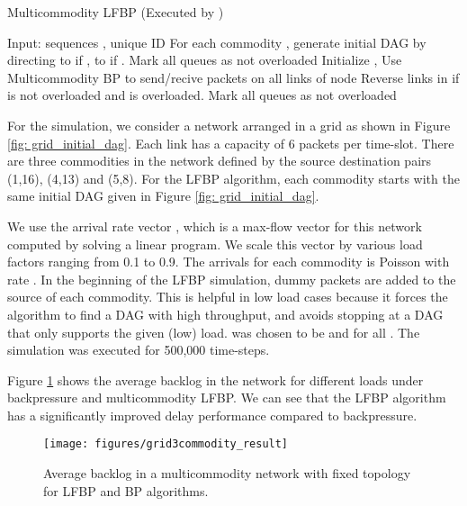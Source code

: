\documentclass{sig-alternate-2013}
\begin{document}
\begin{algorithm}[h] 
\caption{Multicommodity LFBP (Executed by )}
\label{alg:mlfbp}
\begin{algorithmic}[1]
\State Input: sequences , unique ID 
\State For each commodity , generate initial DAG  by directing  to  if , to  if .
\State Mark all queues  as not overloaded
\State Initialize , 
	\State Use Multicommodity BP to send/recive packets on all links of node 
	\ForAll {}	
		\If {}  \EndIf
	\EndFor
	\State 
\State	
	\State 
	\If {} 
		\ForAll {}
			\State Reverse links  in  if  is not overloaded and  is overloaded.
		\EndFor
		\State 
		\State Mark all queues as not overloaded
	\EndIf
	
\EndWhile
\end{algorithmic}
\end{algorithm}

For the simulation, we consider a network arranged in a  grid as shown in Figure \ref{fig: grid_initial_dag}. Each link has a capacity of 6 packets per time-slot. There are three commodities in the network defined by the source destination pairs (1,16), (4,13) and (5,8). For the LFBP algorithm, each commodity starts with the same initial DAG given in Figure \ref{fig: grid_initial_dag}. 

We use the arrival rate vector , which is a max-flow vector for this network computed by solving a linear program. We scale this vector by various load factors  ranging from 0.1 to 0.9. The arrivals for each commodity  is Poisson with rate . In the beginning of the LFBP simulation,  dummy packets are added to the source of each commodity. This is helpful in low load cases because it forces the algorithm to find a DAG with high throughput, and avoids stopping at a DAG that only supports the given (low) load.  was chosen to be  and  for all . The simulation was executed for 500,000 time-steps.

Figure \ref{3commodity_plot} shows the average backlog in the network for different loads under backpressure and multicommodity LFBP. We can see that the LFBP algorithm has a significantly improved delay performance compared to backpressure.

\begin{figure}[h!]
\centering
\texttt{[image: figures/grid3commodity\_result]}
\caption{Average backlog in a multicommodity network with fixed topology for LFBP and BP algorithms.}
\label{3commodity_plot}
\end{figure}
\end{document}
